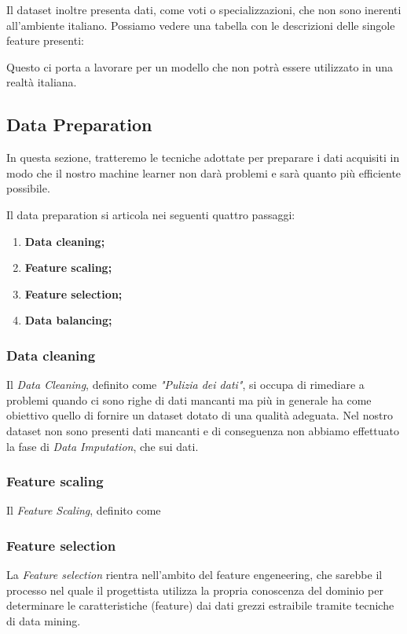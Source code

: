 \documentclass[12pt]{article}
\begin{document}
Il dataset inoltre presenta dati, come voti o specializzazioni, che non sono inerenti all'ambiente italiano. Possiamo vedere una tabella con le descrizioni delle singole feature presenti:



Questo ci porta a lavorare per un modello che non potrà essere utilizzato in una realtà italiana.

\newpage

\subsection{Data Preparation}
In questa sezione, tratteremo le tecniche adottate per preparare i dati acquisiti in modo che il nostro machine learner
non darà problemi e sarà quanto più efficiente possibile.

Il data preparation si articola nei seguenti quattro passaggi:

\begin{enumerate}
    \item \textbf{Data cleaning;}
    \item \textbf{Feature scaling;}
    \item \textbf{Feature selection;}
    \item \textbf{Data balancing;}
\end{enumerate}

\subsubsection{Data cleaning}
Il \textit{Data Cleaning}, definito come \textit{"Pulizia dei dati"}, si occupa di rimediare a problemi quando ci sono righe
di dati mancanti ma più in generale ha come obiettivo quello di fornire un dataset dotato di una qualità adeguata.
Nel nostro dataset non sono presenti dati mancanti e di conseguenza non abbiamo effettuato la fase di \textit{Data Imputation}, che
sui dati.

\subsubsection{Feature scaling}
Il \textit{Feature Scaling}, definito come 

\subsubsection{Feature selection}
La \textit{Feature selection} rientra nell'ambito del feature engeneering, che sarebbe il processo nel quale il progettista
utilizza la propria conoscenza del dominio per determinare le caratteristiche (feature) dai dati grezzi estraibile tramite tecniche
di data mining.
\end{document}
